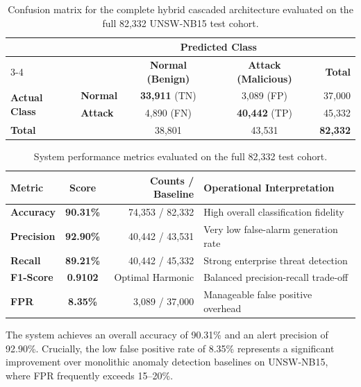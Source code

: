 \documentclass[preprint,12pt]{elsarticle}
\begin{document}
\begin{table}[t]
\centering
\caption{Confusion matrix for the complete hybrid cascaded architecture evaluated on the full 82,332 UNSW-NB15 test cohort.}
\label{tab:confusion_matrix}
\small
\begin{tabular}{llccr}
\toprule
& & \multicolumn{2}{c}{\textbf{Predicted Class}} & \\
\cmidrule(lr){3-4}
& & \textbf{Normal (Benign)} & \textbf{Attack (Malicious)} & \textbf{Total} \\
\midrule
\multirow{2}{*}{\textbf{Actual Class}} 
& \textbf{Normal} & \textbf{33,911} (TN) & 3,089 (FP) & 37,000 \\
& \textbf{Attack} & 4,890 (FN) & \textbf{40,442} (TP) & 45,332 \\
\midrule
\textbf{Total} & & 38,801 & 43,531 & \textbf{82,332} \\
\bottomrule
\end{tabular}
\end{table}

\begin{table}[t]
\centering
\caption{System performance metrics evaluated on the full 82,332 test cohort.}
\label{tab:global_metrics}
\small
\begin{tabular}{lcrl}
\toprule
\textbf{Metric} & \textbf{Score} & \textbf{Counts / Baseline} & \textbf{Operational Interpretation} \\
\midrule
\textbf{Accuracy}  & \textbf{90.31\%} & 74,353 / 82,332 & High overall classification fidelity \\
\textbf{Precision} & \textbf{92.90\%} & 40,442 / 43,531 & Very low false-alarm generation rate \\
\textbf{Recall}    & \textbf{89.21\%} & 40,442 / 45,332 & Strong enterprise threat detection \\
\textbf{F1-Score}  & \textbf{0.9102}  & Optimal Harmonic & Balanced precision-recall trade-off \\
\textbf{FPR}       & \textbf{8.35\%}  & 3,089 / 37,000  & Manageable false positive overhead \\
\bottomrule
\end{tabular}
\end{table}

The system achieves an overall accuracy of 90.31\% and an alert precision of 92.90\%. Crucially, the low false positive rate of 8.35\% represents a significant improvement over monolithic anomaly detection baselines on UNSW-NB15, where FPR frequently exceeds 15--20\%.
\end{document}
